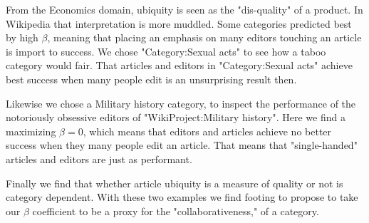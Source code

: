 From the Economics domain, ubiquity is seen as the "dis-quality" of a product. In Wikipedia that interpretation is more muddled. Some categories predicted best by high $\beta$, meaning that placing an emphasis on many editors touching an article is import to success. We chose "Category:Sexual acts" to see how a taboo category would fair. That articles and editors in "Category:Sexual acts"  achieve best success when many people edit is an unsurprising result then.

Likewise we chose a Military history category, to inspect the performance  of the notoriously obsessive editors of "WikiProject:Military history". Here we find a maximizing $\beta = 0$, which means that editors and articles achieve no better success when they many people edit an article. That means that "single-handed" articles and editors are just as performant.

Finally we find  that whether article ubiquity is a measure of quality or not is category dependent. With these two examples we find footing to propose to take our $\beta$ coefficient to be a proxy for the "collaborativeness," of a category. 
 

